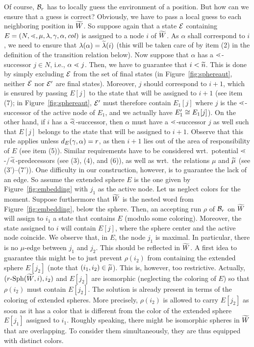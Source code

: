 \documentclass{LMCS}
\begin{document}
Of course, $\mathcal{B}_r$ has to locally guess the environment of a position.
But how can we ensure that a guess is correct? Obviously, we have to pass a
local guess to each neighboring position in ${\widetilde{W}}$. So suppose again that a
state $\mathcal{E}$ containing $E=(N,\mathord{\lessdot},\mu,\lambda,\gamma,\alpha,\mathit{col})$ is
assigned to a node $i$ of ${\widetilde{W}}$. As $\alpha$ shall correspond to $i$, we need
to ensure that $\lambda(\alpha) = \widetilde{\lambda}(i)$ (this will be taken care of by
item (2) in the definition of the transition relation below). Now suppose that
$\alpha$ has a $\mathord{\lessdot}$-successor $j \in N$, i.e., $\alpha \mathrel{\lessdot} j$.
Then, we have to guarantee that $i < \widetilde{n}$. This is done by simply excluding
$\mathcal{E}$ from the set of final states (in Figure~\ref{fig:sphereaut}, neither
$\mathcal{E}$ nor $\mathcal{E}'$ are final states). Moreover, $j$ should correspond to
$i+1$, which is ensured by passing $E[j]$ to the state that will be assigned
to $i+1$ (see item (7); in Figure~\ref{fig:sphereaut}, $\mathcal{E}'$ must
therefore contain $E_1[j]$ where $j$ is the $\mathrel{\lessdot}$-successor of the active
node of $E_1$, and we actually have $E_1' \cong E_1[j]$). On the other hand,
if $i$ has a $\widetilde{\mathord{\lessdot}}$-successor, then $\alpha$ must have a
$\mathord{\lessdot}$-successor $j$ as well such that $E[j]$ belongs to the state that
will be assigned to $i+1$. Observe that this rule applies unless
$d_E(\gamma,\alpha) = r$, as then $i+1$ lies out of the area of
responsibility of $E$ (see item (5)). Similar requirements have to be
considered wrt.\ potential $\mathord{\lessdot}$-/$\widetilde{\mathord{\lessdot}}$-predecessors (see (3), (4),
and (6)), as well as wrt.\ the relations $\mu$ and $\widetilde{\mu}$ (see (3')--(7')).
One difficulty in our construction, however, is to guarantee the lack of an
edge. So assume the extended sphere $E$ is the one given by
Figure~\ref{fig:embedding} with $j_1$ as the active node. Let us neglect
colors for the moment. Suppose furthermore that ${\widetilde{W}}$ is the nested word from
Figure~\ref{fig:embedding}, below the sphere. Then, an accepting run $\rho$ of
$\mathcal{B}_r$ on ${\widetilde{W}}$ will assign to $i_1$ a state that contains $E$ (modulo
some coloring). Moreover, the state assigned to $i$ will contain $E[j]$, where
the sphere center and the active node coincide. We observe that, in $E$, the
node $j_1$ is maximal. In particular, there is no $\mu$-edge between $j_1$ and
$j_2$. This should be reflected in ${\widetilde{W}}$. A first idea to guarantee this might
be to just prevent $\rho(i_2)$ from containing the extended sphere $E[j_2]$
(note that $(i_1,i_2) \in \widetilde{\mu}$). This is, however, too restrictive. Actually,
$(r\text{-}\mathrm{Sph}({\widetilde{W}},i),i_2)$ and $E[j_2]$ are isomorphic (neglecting the
coloring of $E$) so that $\rho(i_2)$ must contain $E[j_2]$. The solution is
already present in terms of the coloring of extended spheres. More precisely,
$\rho(i_2)$ is allowed to carry $E[j_2]$ as soon as it has a color that is
different from the color of the extended sphere $E[j_1]$ assigned to $i_1$.
Roughly speaking, there might be isomorphic spheres in ${\widetilde{W}}$ that are
overlapping. To consider them simultaneously, they are thus equipped with
distinct colors.
\end{document}
